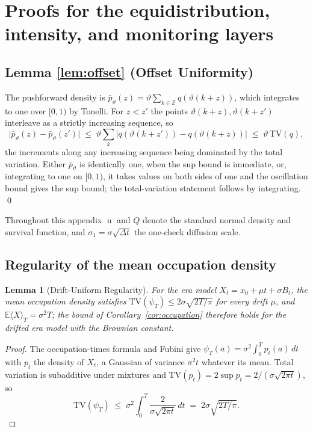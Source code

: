 \documentclass[11pt,a4paper]{article}
\theoremstyle{definition}
\theoremstyle{plain}
\newtheorem{lemma}{Lemma}
\theoremstyle{remark}
\newcommand{\surv}{Q}
\DeclareMathOperator{\nden}{n}
\begin{document}
\section{Proofs for the equidistribution, intensity, and monitoring layers}\label{app:intensity}

\subsection{Lemma \ref{lem:offset} (Offset Uniformity)}

The pushforward density is $\bar p_\vartheta(z) = \vartheta \sum_{k \in \mathbb{Z}} q(\vartheta(k+z))$, which integrates to one over $[0,1)$ by Tonelli. For $z < z'$ the points 
$\vartheta(k+z), \vartheta(k+z')$ interleave as a strictly increasing sequence, so
\[
\big|\bar p_\vartheta(z) - \bar p_\vartheta(z')\big|
\;\le\; \vartheta \sum_k
\big|q(\vartheta(k+z')) - q(\vartheta(k+z))\big|
\;\le\; \vartheta\, \mathrm{TV}(q),
\]
the increments along any increasing sequence being dominated by the total variation. Either $\bar p_\vartheta$ is identically one, when the sup bound is immediate, or, integrating 
to one on $[0,1)$, it takes values on both sides of one and the oscillation bound gives the sup bound; the total-variation statement follows by integrating. \qed

Throughout this appendix $\nden$ and $\surv$ denote the standard normal density and survival function, and $\sigma_1 = \sigma\sqrt{\Delta t}$ the one-check diffusion scale.

\subsection{Regularity of the mean occupation density}

\begin{lemma}[Drift-Uniform Regularity]\label{lem:psireg}
For the era model $X_t = x_0 + \mu t + \sigma B_t$, the mean occupation density satisfies $\mathrm{TV}(\psi_T) \le 2\sigma\sqrt{2T/\pi}$ for every drift $\mu$, and 
$\mathbb{E}\langle X \rangle_T = \sigma^2 T$; the bound of Corollary~\ref{cor:occupation} therefore holds for the drifted era model with the Brownian constant.
\end{lemma}

\begin{proof}
The occupation-times formula and Fubini give $\psi_T(a) = \sigma^2
\int_0^T p_t(a)\, dt$ with $p_t$ the density of $X_t$, a Gaussian of variance $\sigma^2 t$ whatever its 
mean. Total variation is subadditive under mixtures and $\mathrm{TV}(p_t) = 2 \sup p_t = 2/(\sigma\sqrt{2\pi t})$, so
\[
\mathrm{TV}(\psi_T) \;\le\; \sigma^2
\int_0^T \frac{2}{\sigma\sqrt{2\pi t}}\, dt \;=\; 2\sigma\sqrt{2T/\pi}.
\]
\end{proof}
\end{document}
